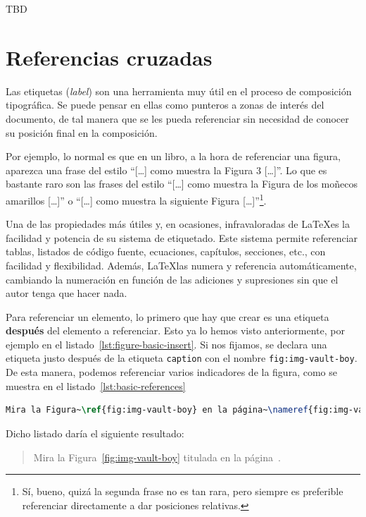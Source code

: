 TBD

\section{Referencias cruzadas}
\label{s:crossref}

Las etiquetas (\textit{label}) son una herramienta muy útil en el proceso de composición tipográfica. Se puede pensar en ellas como punteros a zonas de interés del documento, de tal manera que se les pueda referenciar sin necesidad de conocer su posición final en la composición.

Por ejemplo, lo normal es que en un libro, a la hora de referenciar una figura, aparezca una frase del estilo ``[\ldots] como muestra la Figura 3 [\ldots]''. Lo que es bastante raro son las frases del estilo ``[\ldots] como muestra la Figura de los moñecos amarillos [\ldots]'' o ``[\ldots] como muestra la siguiente Figura [\ldots]''\footnote{Sí, bueno, quizá la segunda frase no es tan rara, pero siempre es preferible referenciar directamente a dar posiciones relativas.}.

Una de las propiedades más útiles y, en ocasiones, infravaloradas de \LaTeX es la facilidad y potencia de su sistema de etiquetado. Este sistema permite referenciar tablas, listados de código fuente, ecuaciones, capítulos, secciones, etc., con facilidad y flexibilidad. Además, \LaTeX las numera y referencia automáticamente, cambiando la numeración en función de las adiciones y supresiones sin que el autor tenga que hacer nada.

Para referenciar un elemento, lo primero que hay que crear es una etiqueta \textbf{después} del elemento a referenciar. Esto ya lo hemos visto anteriormente, por ejemplo en el listado~\ref{lst:figure-basic-insert}. Si nos fijamos, se declara una etiqueta justo después de la etiqueta \texttt{caption} con el nombre \texttt{fig:img-vault-boy}. De esta manera, podemos referenciar varios indicadores de la figura, como se muestra en el listado~\ref{lst:basic-references}

\begin{lstlisting}[language=tex, caption=Referenciando una figura y su página,label={lst:basic-references},]
Mira la Figura~\ref{fig:img-vault-boy} en la página~\nameref{fig:img-vault-boy}.
\end{lstlisting}

Dicho listado daría el siguiente resultado:

\blockquote{Mira la Figura~\ref{fig:img-vault-boy} titulada  en la página~\pageref{fig:img-vault-boy}.}

